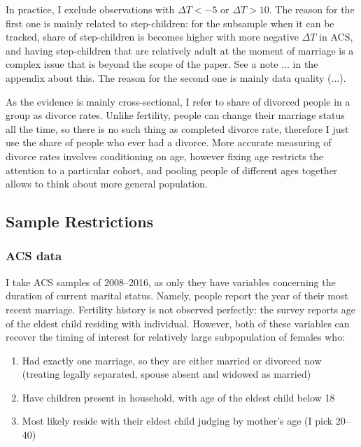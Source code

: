 \documentclass[12pt,letter]{article}
\begin{document}
In practice, I exclude observations with $\Delta T < -5$ or $\Delta T > 10$. The reason for the first one is mainly related to step-children: for the subsample when it can be tracked, share of step-children is becomes higher with more negative $\Delta  T$ in ACS, and having step-children that are relatively adult at the moment of marriage is a complex issue that is beyond the scope of the paper. See a note ... in the appendix about this. The reason for the second one is mainly data quality (...).

As the evidence is mainly cross-sectional, I refer to share of divorced people in a group as divorce rates. Unlike fertility, people can change their marriage status all the time, so there is no such thing as completed divorce rate, therefore I just use the share of people who ever had a divorce. More accurate measuring of divorce rates involves conditioning on age, however fixing age restricts the attention to a particular cohort, and pooling people of different ages together allows to think about more general population.


\subsection{Sample Restrictions}
\subsubsection{ACS data}
I take ACS samples of 2008--2016, as only they have variables concerning the duration of current marital status. Namely, people report the year of their most recent marriage. Fertility history is not observed perfectly: the survey reports age of the eldest child residing with individual. However, both of these variables can recover the timing of interest for relatively large subpopulation of females who:
\begin{enumerate}
\item Had exactly one marriage, so they are either married or divorced now (treating legally separated, spouse absent and widowed as married)
\item Have children present in household, with age of the eldest child below 18
\item Most likely reside with their eldest child judging by mother's age (I pick 20--40)
\end{enumerate}
\end{document}
